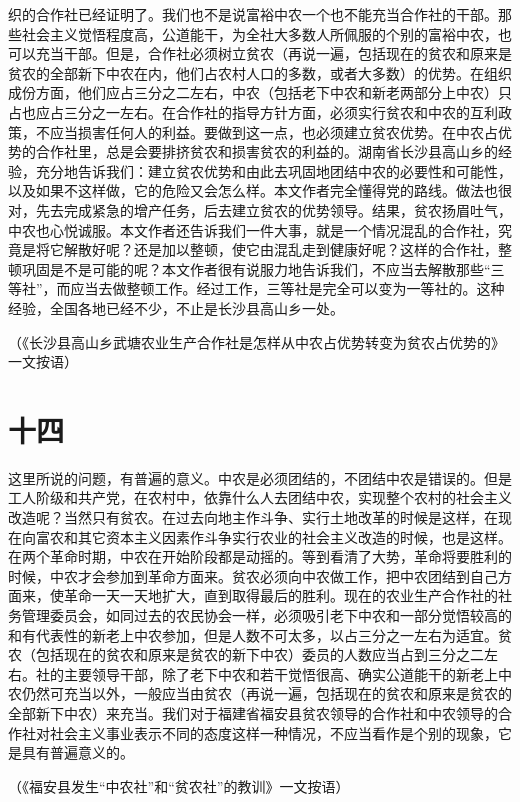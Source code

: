 织的合作社已经证明了。我们也不是说富裕中农一个也不能充当合作社的干部。那些社会主义觉悟程度高，公道能干，为全社大多数人所佩服的个别的富裕中农，也可以充当干部。但是，合作社必须树立贫农（再说一遍，包括现在的贫农和原来是贫农的全部新下中农在内，他们占农村人口的多数，或者大多数）的优势。在组织成份方面，他们应占三分之二左右，中农（包括老下中农和新老两部分上中农）只占也应占三分之一左右。在合作社的指导方针方面，必须实行贫农和中农的互利政策，不应当损害任何人的利益。要做到这一点，也必须建立贫农优势。在中农占优势的合作社里，总是会要排挤贫农和损害贫农的利益的。湖南省长沙县高山乡的经验，充分地告诉我们：建立贫农优势和由此去巩固地团结中农的必要性和可能性，以及如果不这样做，它的危险又会怎么样。本文作者完全懂得党的路线。做法也很对，先去完成紧急的增产任务，后去建立贫农的优势领导。结果，贫农扬眉吐气，中农也心悦诚服。本文作者还告诉我们一件大事，就是一个情况混乱的合作社，究竟是将它解散好呢？还是加以整顿，使它由混乱走到健康好呢？这样的合作社，整顿巩固是不是可能的呢？本文作者很有说服力地告诉我们，不应当去解散那些“三等社”，而应当去做整顿工作。经过工作，三等社是完全可以变为一等社的。这种经验，全国各地已经不少，不止是长沙县高山乡一处。


（《长沙县高山乡武塘农业生产合作社是怎样从中农占优势转变为贫农占优势的》一文按语）

\section*{十四}

这里所说的问题，有普遍的意义。中农是必须团结的，不团结中农是错误的。但是工人阶级和共产党，在农村中，依靠什么人去团结中农，实现整个农村的社会主义改造呢？当然只有贫农。在过去向地主作斗争、实行土地改革的时候是这样，在现在向富农和其它资本主义因素作斗争实行农业的社会主义改造的时候，也是这样。在两个革命时期，中农在开始阶段都是动摇的。等到看清了大势，革命将要胜利的时候，中农才会参加到革命方面来。贫农必须向中农做工作，把中农团结到自己方面来，使革命一天一天地扩大，直到取得最后的胜利。现在的农业生产合作社的社务管理委员会，如同过去的农民协会一样，必须吸引老下中农和一部分觉悟较高的和有代表性的新老上中农参加，但是人数不可太多，以占三分之一左右为适宜。贫农（包括现在的贫农和原来是贫农的新下中农）委员的人数应当占到三分之二左右。社的主要领导干部，除了老下中农和若干觉悟很高、确实公道能干的新老上中农仍然可充当以外，一般应当由贫农（再说一遍，包括现在的贫农和原来是贫农的全部新下中农）来充当。我们对于福建省福安县贫农领导的合作社和中农领导的合作社对社会主义事业表示不同的态度这样一种情况，不应当看作是个别的现象，它是具有普遍意义的。


（《福安县发生“中农社”和“贫农社”的教训》一文按语）

